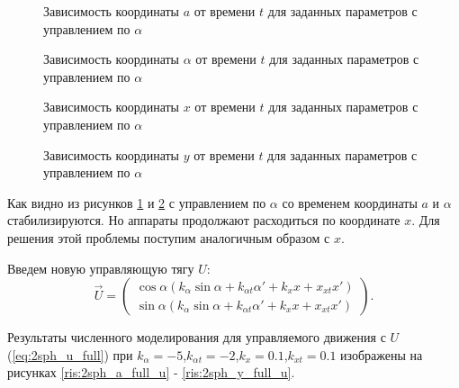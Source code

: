 \begin{figure}[H]
	\caption{Зависимость координаты $a$ от времени $t$ для заданных параметров с управлением по $\alpha$}
	\label{ris:2sph_a_alpha_u}
\end{figure}
\begin{figure}[H]
	\caption{Зависимость координаты $\alpha$ от времени $t$ для заданных параметров с управлением по $\alpha$}
	\label{ris:2sph_alpha_alpha_u}
\end{figure} 
\begin{figure}[H]
	\caption{Зависимость координаты $x$ от времени $t$ для заданных параметров с управлением по $\alpha$}
	\label{ris:2sph_x_alpha_u}
\end{figure} 
\begin{figure}[H]
	\caption{Зависимость координаты $y$ от времени $t$ для заданных параметров с управлением по $\alpha$}
	\label{ris:2sph_y_alpha_u}
\end{figure} 

Как видно из рисунков \ref{ris:2sph_a_alpha_u} и \ref{ris:2sph_alpha_alpha_u} с управлением по $\alpha$ со временем координаты $a$ и $\alpha$ стабилизируются.
Но аппараты продолжают расходиться по координате $x$.
Для решения этой проблемы поступим аналогичным образом с $x$.

Введем новую управляющую тягу $U$:
\begin{equation}
\label{eq:2sph_u_full}
	\vec{U} = 
	\begin{pmatrix}
		\cos \alpha \left(k_\alpha \sin \alpha + k_{\alpha t}\alpha' + k_x x + x_{xt} x'\right)\\
		\sin \alpha \left(k_\alpha \sin \alpha + k_{\alpha t}\alpha' + k_x x + x_{xt} x'\right)
	\end{pmatrix}.
\end{equation}

Результаты численного моделирования для управляемого движения с $U$ (\ref{eq:2sph_u_full}) при $k_\alpha = -5$,$k_{\alpha t} = -2$,$k_x = 0.1$,$k_{x t} = 0.1$ изображены на рисунках \ref{ris:2sph_a_full_u} - \ref{ris:2sph_y_full_u}.

